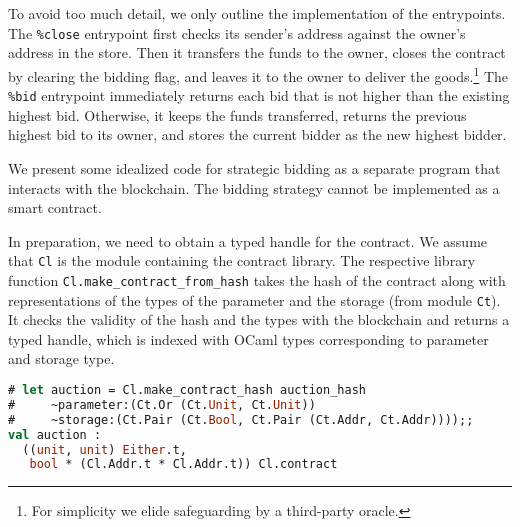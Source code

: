 \documentclass[runningheads]{llncs}
\begin{document}
To avoid too much detail, we only outline the implementation of the entrypoints. The
\lstinline/%close/ entrypoint first checks its sender's address
against the owner's address in the store. Then it transfers the funds
to the owner, closes the contract by clearing the bidding flag, and
leaves it to the owner to deliver the
goods.\footnote{For simplicity we elide safeguarding by a third-party oracle.}
The \lstinline/%bid/ entrypoint immediately returns each bid that is not higher
than the existing highest bid. Otherwise, it keeps the funds
transferred, returns the previous highest bid to its owner, and stores
the current bidder as the new highest bidder.


We present some idealized code for %
strategic bidding as a separate program that interacts with the
blockchain.  The bidding strategy cannot be implemented as a smart
contract.

In preparation, we need to obtain a typed handle for the contract. We
assume that \lstinline!Cl! is the module containing the contract
library. The respective library function
\lstinline!Cl.make_contract_from_hash!
takes the hash of the contract along with representations of
the types of the parameter and the storage (from module
\lstinline!Ct!). It checks the validity of the hash and the types with
the blockchain and returns a typed
handle, which is indexed with OCaml types corresponding to parameter
and storage type.
\begin{lstlisting}[language=Caml,numbers=none,basicstyle=\small]
# let auction = Cl.make_contract_hash auction_hash
#     ~parameter:(Ct.Or (Ct.Unit, Ct.Unit))
#     ~storage:(Ct.Pair (Ct.Bool, Ct.Pair (Ct.Addr, Ct.Addr))));;
val auction :
  ((unit, unit) Either.t,
   bool * (Cl.Addr.t * Cl.Addr.t)) Cl.contract
\end{lstlisting}


\end{document}

